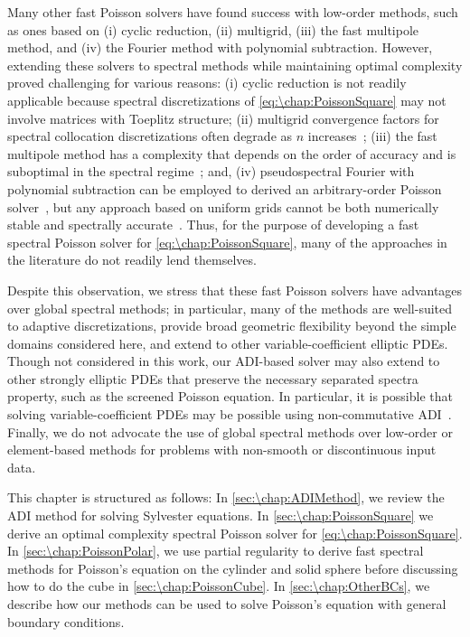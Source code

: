 Many other fast Poisson solvers have found success with low-order methods, such as ones based on (i) cyclic reduction, (ii) multigrid, (iii) the fast multipole method, and (iv) the Fourier method with polynomial subtraction. However, extending these solvers to spectral methods while maintaining optimal complexity proved challenging for various reasons: (i) cyclic reduction is not readily applicable because spectral discretizations of \cref{eq:\chap:PoissonSquare} may not involve matrices with Toeplitz structure; (ii) multigrid convergence factors for spectral collocation discretizations often degrade as $n$ increases~\cite{Gholami_16_01};
(iii) the fast multipole method has a complexity that depends on the order of accuracy and is suboptimal in the spectral regime~\cite{Greengard_96_01, McKenney_95_01}; and, (iv) pseudospectral Fourier with polynomial subtraction can be employed to derived an arbitrary-order Poisson solver~\cite{Averbuch_98_01,Braverman_98_01}, but any approach based on uniform grids cannot be both numerically stable and spectrally accurate~\cite{Platte_11_01}. Thus, for the purpose of developing a fast spectral Poisson solver for \cref{eq:\chap:PoissonSquare}, many of the approaches in the literature do not readily lend themselves.

Despite this observation, we stress that these fast Poisson solvers have advantages over global spectral methods; in particular, many of the methods are well-suited to adaptive discretizations, provide broad geometric flexibility beyond the simple domains considered here, and extend to other variable-coefficient elliptic PDEs. Though not considered in this work, our ADI-based solver may also extend to other strongly elliptic PDEs that preserve the necessary separated spectra property, such as the screened Poisson equation. In particular, it is possible that solving variable-coefficient PDEs may be possible using non-commutative ADI~\cite{Widlund_66_01}. Finally, we do not advocate the use of global spectral methods over low-order or element-based methods for problems with non-smooth or discontinuous input data.

This chapter is structured as follows: In \cref{sec:\chap:ADIMethod}, we review the ADI method for solving Sylvester equations. In \cref{sec:\chap:PoissonSquare} we derive an optimal complexity spectral Poisson solver for \cref{eq:\chap:PoissonSquare}.  In \cref{sec:\chap:PoissonPolar}, we use partial regularity to derive fast spectral methods for Poisson's equation on the cylinder and solid sphere before discussing how to do the cube in \cref{sec:\chap:PoissonCube}. In \cref{sec:\chap:OtherBCs}, we describe how our methods can be used to solve Poisson's equation with general boundary conditions.

